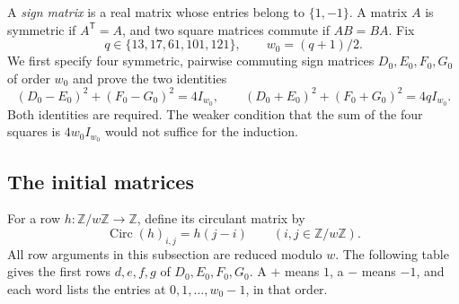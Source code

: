 \documentclass[10pt]{article}
\begin{document}
A \emph{sign matrix} is a real matrix whose entries belong to $\{1,-1\}$.
A matrix $A$ is symmetric if $A^{\mathsf T}=A$, and two square matrices
commute if $AB=BA$. Fix
\[
 q\in\{13,17,61,101,121\},\qquad w_0=(q+1)/2.
\]
We first specify four symmetric, pairwise commuting sign matrices
$D_0,E_0,F_0,G_0$ of order $w_0$ and prove the two identities
\begin{equation}\label{eq:spence-starter-strong}
 (D_0-E_0)^2+(F_0-G_0)^2=4I_{w_0},\qquad
 (D_0+E_0)^2+(F_0+G_0)^2=4qI_{w_0}.
\end{equation}
Both identities are required. The weaker condition that the sum of the
four squares is $4w_0I_{w_0}$ would not suffice for the induction.

\subsection{The initial matrices}

For a row $h\colon\mathbb Z/w\mathbb Z\to\mathbb Z$, define its circulant
matrix by
\[
 \operatorname{Circ}(h)_{i,j}=h(j-i)
 \qquad(i,j\in\mathbb Z/w\mathbb Z).
\]
All row arguments in this subsection are reduced modulo $w$.
The following table gives the first rows $d,e,f,g$ of
$D_0,E_0,F_0,G_0$. A $+$ means $1$, a $-$ means $-1$, and each word lists
the entries at $0,1,\ldots,w_0-1$, in that order.
\end{document}
